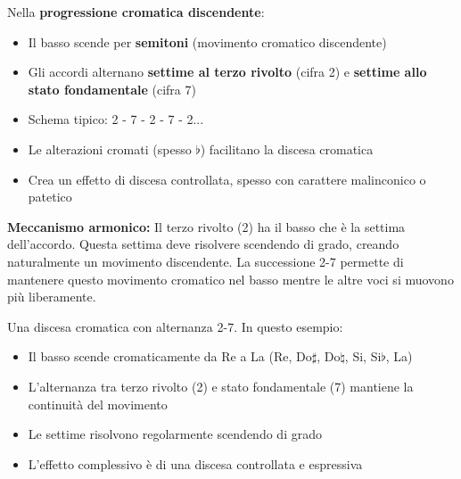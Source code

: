 \begin{regola}
	\label{reg:progressione_cromatica_disc}
	Nella \textbf{progressione cromatica discendente}:
	
	\begin{itemize}
		\item Il basso scende per \textbf{semitoni} (movimento cromatico discendente)
		\item Gli accordi alternano \textbf{settime al terzo rivolto} (cifra 2) e \textbf{settime allo stato fondamentale} (cifra 7)
		\item Schema tipico: 2 - 7 - 2 - 7 - 2...
		\item Le alterazioni cromati (spesso $\flat$) facilitano la discesa cromatica
		\item Crea un effetto di discesa controllata, spesso con carattere malinconico o patetico
	\end{itemize}
	
	\textbf{Meccanismo armonico:}
	Il terzo rivolto (2) ha il basso che è la settima dell'accordo. Questa settima deve risolvere scendendo di grado, creando naturalmente un movimento discendente. La successione 2-7 permette di mantenere questo movimento cromatico nel basso mentre le altre voci si muovono più liberamente.
\end{regola}

\begin{esempio}
	\label{ex:progressione_cromatica_disc}
	Una discesa cromatica con alternanza 2-7.
	In questo esempio:
	\begin{itemize}
		\item Il basso scende cromaticamente da Re a La (Re, Do$\sharp$, Do$\natural$, Si, Si$\flat$, La)
		\item L'alternanza tra terzo rivolto (2) e stato fondamentale (7) mantiene la continuità del movimento
		\item Le settime risolvono regolarmente scendendo di grado
		\item L'effetto complessivo è di una discesa controllata e espressiva
	\end{itemize}
\end{esempio}

